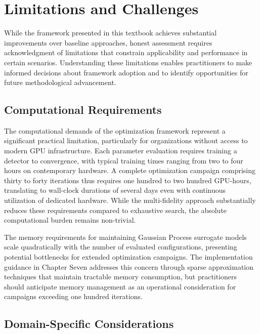\section{Limitations and Challenges}
\label{sec:limitations}

While the framework presented in this textbook achieves substantial improvements over baseline approaches, honest assessment requires acknowledgment of limitations that constrain applicability and performance in certain scenarios. Understanding these limitations enables practitioners to make informed decisions about framework adoption and to identify opportunities for future methodological advancement.

\subsection{Computational Requirements}
\label{subsec:computational_requirements}

The computational demands of the optimization framework represent a significant practical limitation, particularly for organizations without access to modern GPU infrastructure. Each parameter evaluation requires training a detector to convergence, with typical training times ranging from two to four hours on contemporary hardware. A complete optimization campaign comprising thirty to forty iterations thus requires one hundred to two hundred GPU-hours, translating to wall-clock durations of several days even with continuous utilization of dedicated hardware. While the multi-fidelity approach substantially reduces these requirements compared to exhaustive search, the absolute computational burden remains non-trivial.

The memory requirements for maintaining Gaussian Process surrogate models scale quadratically with the number of evaluated configurations, presenting potential bottlenecks for extended optimization campaigns. The implementation guidance in Chapter Seven addresses this concern through sparse approximation techniques that maintain tractable memory consumption, but practitioners should anticipate memory management as an operational consideration for campaigns exceeding one hundred iterations.

\subsection{Domain-Specific Considerations}
\label{subsec:domain_specific}

